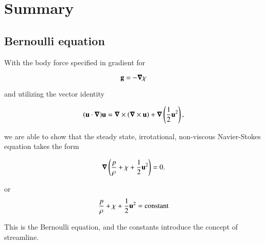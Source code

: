 \section{Summary}
\subsection{Bernoulli equation}

With the body force specified in gradient for

\begin{equation}\label{eqn:continuumFluidsReview:2290}
\mathbf{g} = - \boldsymbol{\nabla} \chi
\end{equation}

and utilizing the vector identity

\begin{equation}\label{eqn:continuumFluidsReview:2310}
(\mathbf{u} \cdot \boldsymbol{\nabla}) \mathbf{u} = \boldsymbol{\nabla} \times (\boldsymbol{\nabla} \times \mathbf{u}) + \boldsymbol{\nabla} \left( \frac{1}{2} \mathbf{u}^2 \right),
\end{equation}

we are able to show that the steady state, irrotational, non-viscous Navier-Stokes equation takes the form

\begin{equation}\label{eqn:continuumFluidsReview:2330}
\boldsymbol{\nabla} \left( \frac{p}{\rho} + \chi + \frac{1}{2} \mathbf{u}^2 \right) = 0.
\end{equation}

or
\begin{equation}\label{eqn:continuumFluidsReview:2350}
\frac{p}{\rho} + \chi + \frac{1}{2} \mathbf{u}^2 = \text{constant}
\end{equation}

This is the Bernoulli equation, and the constants introduce the concept of streamline.  


